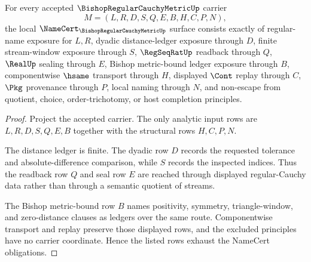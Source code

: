 \begin{theorem}
\label{thm:bishop-regular-cauchy-metric-namecert-obligations}
For every accepted $\BishopRegularCauchyMetricUp$ carrier
$$
M=(L,R,D,S,Q,E,B,H,C,P,N),
$$
the local $\NameCert_{\BishopRegularCauchyMetricUp}$ surface consists exactly of regular-name exposure for $L,R$, dyadic distance-ledger exposure through $D$, finite stream-window exposure through $S$, $\RegSeqRatUp$ readback through $Q$, $\RealUp$ sealing through $E$, Bishop metric-bound ledger exposure through $B$, componentwise $\hsame$ transport through $H$, displayed $\Cont$ replay through $C$, $\Pkg$ provenance through $P$, local naming through $N$, and non-escape from quotient, choice, order-trichotomy, or host completion principles.
\end{theorem}
\begin{proof}
Project the accepted carrier. The only analytic input rows are $L,R,D,S,Q,E,B$ together with the structural rows $H,C,P,N$.

The distance ledger is finite. The dyadic row $D$ records the requested tolerance and absolute-difference comparison, while $S$ records the inspected indices. Thus the readback row $Q$ and seal row $E$ are reached through displayed regular-Cauchy data rather than through a semantic quotient of streams.

The Bishop metric-bound row $B$ names positivity, symmetry, triangle-window, and zero-distance clauses as ledgers over the same route. Componentwise transport and replay preserve those displayed rows, and the excluded principles have no carrier coordinate. Hence the listed rows exhaust the NameCert obligations.
\end{proof}

